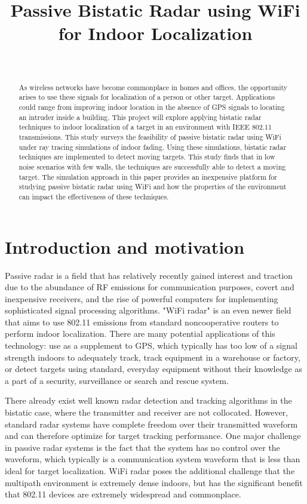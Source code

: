\documentclass[article,11pt,onecolumn,final]{IEEEtran}
\title{Passive Bistatic Radar using WiFi for Indoor Localization}
\author{\IEEEauthorblockN{Alexander and Ernest (TODO last names)}  \\
\IEEEauthorblockA{Department of Electrical and Computer Engineering\\ 
Boston University
}}
\begin{document}
\maketitle
\begin{abstract}
As wireless networks have become commonplace in homes and offices, the opportunity arises to use
these signals for localization of a person or other target. Applications could range from improving indoor
location in the absence of GPS signals to locating an intruder inside a building. This project will explore
applying bistatic radar techniques to indoor localization of a target in an environment with IEEE 802.11
transmissions. This study surveys the feasibility of passive bistatic radar
using WiFi under ray tracing simulations of indoor fading. Using these simulations, bistatic radar techniques are
implemented to detect moving targets. This study finds that in low noise scenarios with few walls, the
techniques are successfully able to detect a moving target. The simulation approach in this paper 
provides an inexpensive platform for studying passive bistatic radar using WiFi and how the properties of
the environment can impact the effectiveness of these techniques.
\end{abstract}

\section{Introduction and motivation} 
Passive radar is a field that has relatively recently gained interest and traction due to the abundance of
RF emissions for communication purposes, covert and inexpensive receivers, and the rise of powerful
computers for implementing sophisticated signal processing algorithms. "WiFi radar" is an even newer
field that aims to use 802.11 emissions from standard noncooperative routers to perform indoor
localization. There are many potential applications of this technology: use as a supplement to GPS,
which typically has too low of a signal strength indoors to adequately track, track equipment in a
warehouse or factory, or detect targets using standard, everyday equipment without their knowledge as
a part of a security, surveillance or search and rescue system.

There already exist well known radar detection and tracking algorithms in the bistatic case, where the
transmitter and receiver are not collocated. However, standard radar systems have complete freedom
over their transmitted waveform and can therefore optimize for target tracking performance. One major
challenge in passive radar systems is the fact that the system has no control over the waveform, which
typically is a communication system waveform that is less than ideal for target localization. WiFi radar
poses the additional challenge that the multipath environment is extremely dense indoors, but has the
significant benefit that 802.11 devices are extremely widespread and commonplace.
\end{document}
